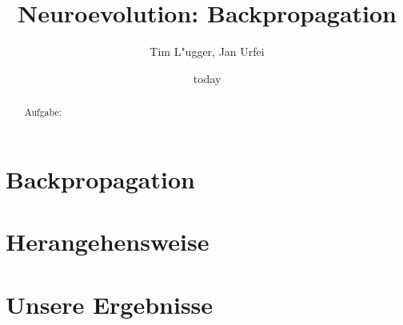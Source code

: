 \documentclass{hbrs-ecta-report}
\begin{document}

\title{Neuroevolution: Backpropagation}
\subtitle{}

\author{
\alignauthor
Tim L"ugger, Jan Urfei
}

\date{today}
\maketitle
\begin{abstract}
Aufgabe: 
\end{abstract}

\section{Backpropagation}


\FloatBarrier

\section{Herangehensweise}
 


\FloatBarrier

\section{Unsere Ergebnisse}
\end{document}
